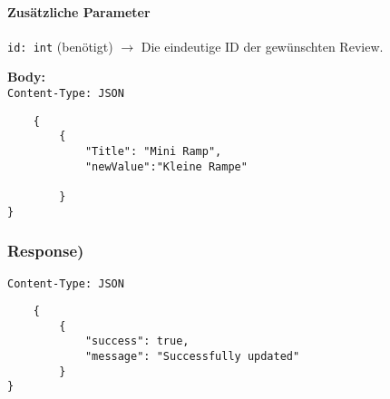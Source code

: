 \paragraph{Zusätzliche Parameter}
\lstinline{id: int} (benötigt)
$\rightarrow$ Die eindeutige ID der gewünschten Review.

\textbf{Body:}\\
\lstinline{Content-Type: JSON}
\begin{lstlisting}
    {
        {
            "Title": "Mini Ramp",
            "newValue":"Kleine Rampe"

        }
}
\end{lstlisting}

\subsubsection{Response)}

\lstinline{Content-Type: JSON}
\begin{lstlisting}
    {
        {
            "success": true,
            "message": "Successfully updated"
        }
}
\end{lstlisting}

\pagebreak

